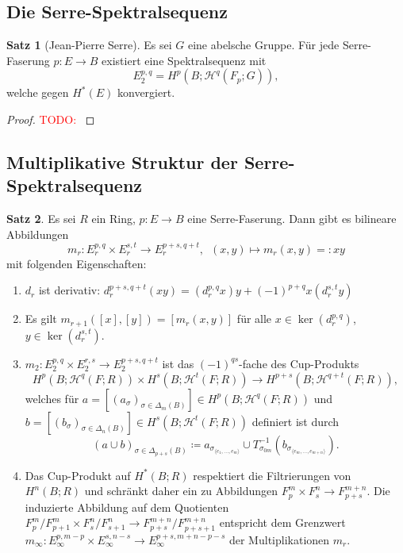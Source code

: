 \documentclass[11pt, a4paper, german]{article}
\theoremstyle{definition}
\newtheorem*{satz}{Satz}
\theoremstyle{remark}
\newcommand{\TODO}[1]{\textcolor{red}{TODO: #1}} %
\newcommand{\angles}[1]{{\langle #1 \rangle}}
\newcommand{\LH}{\mathcal{H}} %
\begin{document}
\subsection{Die Serre-Spektralsequenz}

\begin{satz}[Jean-Pierre Serre]
  Es sei $G$ eine abelsche Gruppe.
  Für jede Serre-Faserung $p : E \to B$ existiert eine Spektralsequenz mit
  \[ E_2^{p,q} = H^p(B; \LH^q(F_p; G)), \]
  welche gegen $H^*(E)$ konvergiert.
\end{satz}

\begin{proof}
  \TODO{}
\end{proof}

\subsection{Multiplikative Struktur der Serre-Spektralsequenz}

\begin{satz}
  Es sei $R$ ein Ring, $p : E \to B$ eine Serre-Faserung.
  Dann gibt es bilineare Abbildungen
  \[ m_r : E^{p,q}_r \times E^{s,t}_r \to E^{p+s,q+t}_r, \enspace (x, y) \mapsto m_r(x, y) =: xy \]
  mit folgenden Eigenschaften:
  \begin{enumerate}[label=(\roman*)]
    \item $d_r$ ist derivativ: $d_r^{p+s,q+t}(xy) = (d_r^{p,q} x) y + (-1)^{p+q} x (d_r^{s,t} y)$
    \item Es gilt $m_{r+1}([x], [y]) = [m_r(x, y)]$ für alle $x \in \ker(d_r^{p,q})$, $y \in \ker(d_r^{s,t})$.
    \item $m_2 : E_2^{p,q} \!\times\! E_2^{r,s} \!\to\! E_2^{p+s,q+t}$ ist das $(-1)^{qs}$-fache des Cup-Produkts
    \[
      H^p(B; \LH^q(F; R)) \times H^s(B; \LH^t(F; R)) \to H^{p+s}(B; \LH^{q+t}(F; R)),
    \]
    welches für $a = [(a_\sigma)_{\sigma \in \Delta_m(B)}] \in H^p(B; \LH^q(F; R))$ und $b = [(b_\sigma)_{\sigma \in \Delta_n(B)}] \in H^s(B; \LH^t(F; R))$ definiert ist durch
    \[
      (a \cup b)_{\sigma \in \Delta_{p+s}(B)} \coloneqq
      a_{\sigma_{\angles{e_1, \ldots, e_m}}} \cup T_{\sigma_{0m}}^{-1}(b_{\sigma_{\angles{e_m, \ldots, e_{m+n}}}}).
    \]
    \item Das Cup-Produkt auf $H^*(B; R)$ respektiert die Filtrierungen von $H^n(B; R)$ und schränkt daher ein zu Abbildungen $F_p^m \times F_s^n \to F_{p+s}^{m+n}$.
    Die induzierte Abbildung auf dem Quotienten $F^m_p/F^m_{p+1} \times F^n_s/F^n_{s+1} \to F^{m+n}_{p+s} / F^{m+n}_{p+s+1}$ entspricht dem Grenzwert $m_\infty : E_\infty^{p,m-p} \times E_\infty^{s,n-s} \to E_\infty^{p+s,m+n-p-s}$ der Multiplikationen $m_r$.
  \end{enumerate}
\end{satz}
\end{document}
